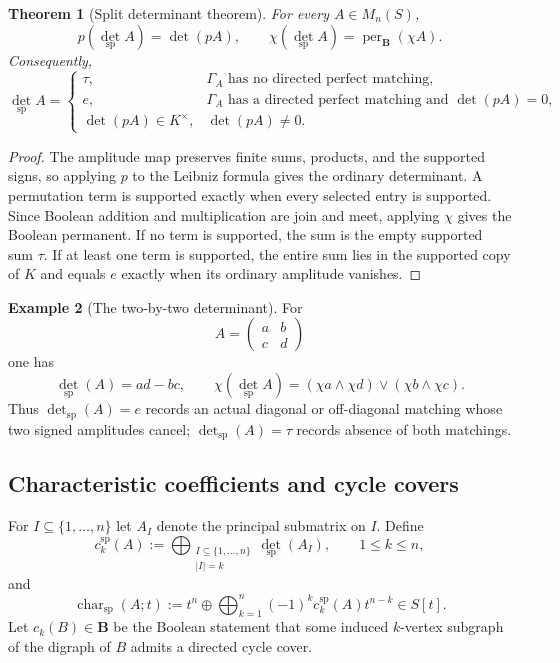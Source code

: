 \documentclass[11pt]{amsart}
\numberwithin{equation}{section}
\newtheorem{theorem}{Theorem}[section]
\theoremstyle{definition}
\newtheorem{example}[theorem]{Example}
\newcommand{\B}{\mathbf B}
\newcommand{\detsp}{\operatorname{det}_{\mathrm{sp}}}
\newcommand{\charsp}{\operatorname{char}_{\mathrm{sp}}}
\begin{document}
\begin{theorem}[Split determinant theorem]
\label{thm:split-determinant}
For every $A\in M_n(S)$,
\[
p(\detsp A)=\det(pA),
\qquad
\chi(\detsp A)=\operatorname{per}_{\B}(\chi A).
\]
Consequently,
\[
\detsp A=
\begin{cases}
\tau,&\Gamma_A\text{ has no directed perfect matching},\\
e,&\Gamma_A\text{ has a directed perfect matching and }\det(pA)=0,\\
\det(pA)\in K^\times,&\det(pA)\neq0.
\end{cases}
\]
\end{theorem}

\begin{proof}
The amplitude map preserves finite sums, products, and the supported signs,
so applying $p$ to the Leibniz formula gives the ordinary determinant.
A permutation term is supported exactly when every selected entry is
supported.  Since Boolean addition and multiplication are join and meet,
applying $\chi$ gives the Boolean permanent.  If no term is supported, the
sum is the empty supported sum $\tau$.  If at least one term is supported,
the entire sum lies in the supported copy of $K$ and equals $e$ exactly when
its ordinary amplitude vanishes.
\end{proof}

\begin{example}[The two-by-two determinant]
For
\[
A=\begin{pmatrix}a&b\\c&d\end{pmatrix}
\]
one has
\[
\detsp(A)=ad-bc,
\qquad
\chi(\detsp A)
=(\chi a\wedge\chi d)\vee(\chi b\wedge\chi c).
\]
Thus $\detsp(A)=e$ records an actual diagonal or off-diagonal matching whose
two signed amplitudes cancel; $\detsp(A)=\tau$ records absence of both
matchings.
\end{example}

\subsection{Characteristic coefficients and cycle covers}

For $I\subseteq\{1,\dots,n\}$ let $A_I$ denote the principal submatrix on
$I$.  Define
\[
c_k^{\mathrm{sp}}(A)
:=
\bigoplus_{\substack{I\subseteq\{1,\dots,n\}\\|I|=k}}
\detsp(A_I),
\qquad 1\le k\le n,
\]
and
\[
\charsp(A;t)
:=t^n\oplus
\bigoplus_{k=1}^n(-1)^k c_k^{\mathrm{sp}}(A)t^{n-k}
\in S[t].
\]
Let $c_k(B)\in\B$ be the Boolean statement that some induced $k$-vertex
subgraph of the digraph of $B$ admits a directed cycle cover.
\end{document}
